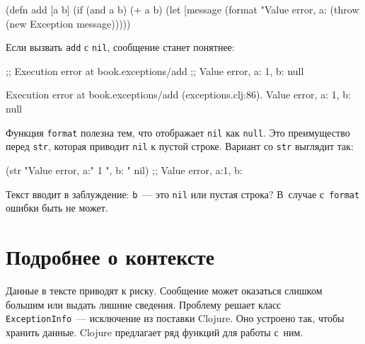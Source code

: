 \begin{english}
  \begin{clojure}
(defn add [a b]
  (if (and a b)
    (+ a b)
    (let [message (format "Value error, a: %
      (throw (new Exception message)))))
  \end{clojure}
\end{english}

\fi

\noindent
Если вызвать \verb|add| с \verb|nil|, сообщение станет понятнее:

\ifx\devicetype\mobile

\begin{english}
  \begin{clojure}
;; Execution error at book.exceptions/add
;; Value error, a: 1, b: null
  \end{clojure}
\end{english}

\else

\begin{english}
  \begin{clojure}
Execution error at book.exceptions/add (exceptions.clj:86).
Value error, a: 1, b: null
  \end{clojure}
\end{english}

\fi

Функция \verb|format| полезна тем, что отображает \verb|nil| как
\verb|null|. Это преимущество перед \verb|str|, которая приводит
\verb|nil| к пустой строке. Вариант со \verb|str| выглядит так:

\begin{english}
  \begin{clojure}
(str "Value error, a:" 1 ", b: " nil)
;; Value error, a:1, b:
  \end{clojure}
\end{english}

\noindent
Текст вводит в заблуждение: \verb|b|~--- это \verb|nil| или пустая строка? В~случае
с~\verb|format| ошибки быть не может.

\section{Подробнее о контексте}


Данные в тексте приводят к риску. Сообщение может оказаться слишком большим или
выдать лишние сведения. Проблему решает класс \verb|ExceptionInfo|~---
исключение из поставки Clojure. Оно устроено так, чтобы хранить данные. Clojure
предлагает ряд функций для работы с~ним.

